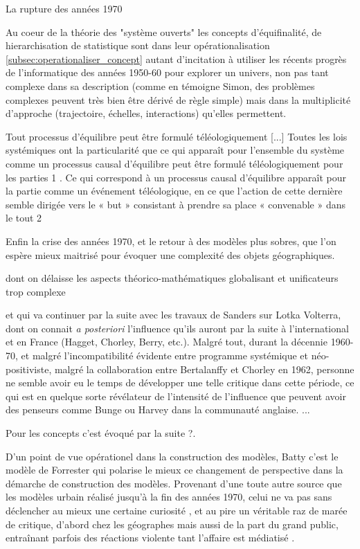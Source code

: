 La rupture des années 1970 

Au coeur de la théorie des "système ouverts" les concepts d'équifinalité, de hierarchisation de statistique sont dans leur opérationalisation \ref{subsec:operationaliser_concept} autant d'incitation à utiliser les récents progrès de l'informatique des années 1950-60 pour explorer un univers, non pas tant complexe dans sa description (comme en témoigne Simon, des problèmes complexes peuvent très bien être dérivé de règle simple) mais dans la multiplicité d'approche (trajectoire, échelles, interactions) qu'elles permettent.

\autocite[114]{Pouvreau2013}
Tout processus d’équilibre peut être formulé téléologiquement [...] Toutes les lois systémiques ont
la particularité que ce qui apparaît pour l’ensemble du système comme un processus causal
d’équilibre peut être formulé téléologiquement pour les parties 1 .
Ce qui correspond à un processus causal d’équilibre apparaît pour la partie comme un événement
téléologique, en ce que l’action de cette dernière semble dirigée vers le « but » consistant à prendre
sa place « convenable » dans le tout 2

Enfin la crise des années 1970, et le retour à des modèles plus sobres, que l'on espère mieux maitrisé pour évoquer une complexité des objets géographiques.

dont on délaisse les aspects théorico-mathématiques globalisant et unificateurs trop complexe

et qui va continuer par la suite avec les travaux de Sanders sur Lotka Volterra,   dont on connait \textit{a posteriori} l'influence qu'ils auront par la suite à l'international et en France (Hagget, Chorley, Berry, etc.). Malgré tout, durant la décennie 1960-70, et malgré l'incompatibilité  évidente entre programme systémique et néo-positiviste, malgré la collaboration entre Bertalanffy et Chorley en 1962, personne ne semble avoir eu le temps de développer une telle critique dans cette période, ce qui est en quelque sorte révélateur de l'intensité de l'influence que peuvent avoir des penseurs comme Bunge ou Harvey dans la communauté anglaise. \autocite[123]{Unwin1992}...

Pour les concepts c'est évoqué par la suite ?. 

D'un point de vue opérationel dans la construction des modèles, Batty \autocite{Batty2001} \autocite[13]{Batty2008} c'est le modèle de Forrester \autocite{Forrester1969} qui polarise le mieux ce changement de perspective dans la démarche de construction des modèles. Provenant d'une toute autre source que les modèles urbain réalisé jusqu'à la fin des années 1970, celui ne va pas sans déclencher au mieux une certaine curiosité \autocite{Lee1973} , et au pire un véritable raz de marée de critique, d'abord chez les géographes\autocite{Tobler1970a} mais aussi de la part du grand public, entraînant parfois des réactions violente tant l'affaire est médiatisé \autocite[9]{Forrester1989}. 

